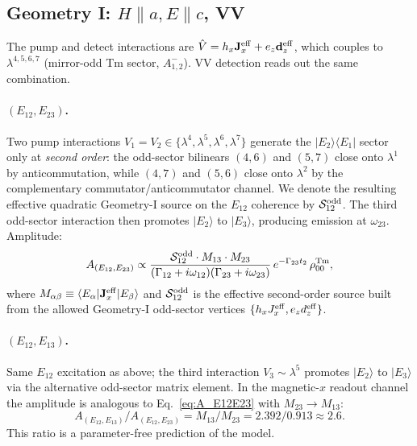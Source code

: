 \documentclass[reprint,amsmath,amssymb,aps,prb,longbibliography]{revtex4-2}
\newcommand{\Jeff}{\mathbf{J}^{\rm eff}}
\newcommand{\deff}{\mathbf{d}^{\rm eff}}
\begin{document}
\subsection{Geometry I: \texorpdfstring{$H\parallel a, E\parallel c$, VV}{H||a, E||c, VV}}

The pump and detect interactions are $\hat V = h_x\Jeff_x + e_z\deff_z$,
which couples to $\lambda^{4,5,6,7}$ (mirror-odd Tm sector, $A_{1,2}^-$).
VV detection reads out the same combination.

\paragraph{$(E_{12}, E_{23})$.} Two pump interactions $V_1 = V_2 \in
\{\lambda^4,\lambda^5,\lambda^6,\lambda^7\}$ generate the
$|E_2\rangle\langle E_1|$ sector only at \emph{second order}: the odd-sector
bilinears $(4,6)$ and $(5,7)$ close onto $\lambda^1$ by anticommutation,
while $(4,7)$ and $(5,6)$ close onto $\lambda^2$ by the complementary
commutator/anticommutator channel. We denote the resulting effective
quadratic Geometry-I source on the $E_{12}$ coherence by
$\mathcal S_{12}^{\rm odd}$. The third odd-sector interaction then promotes
$|E_2\rangle$ to $|E_3\rangle$, producing emission at $\omega_{23}$.
Amplitude:
\begin{equation}
A_{(E_{12},E_{23})} \propto
\frac{\mathcal S_{12}^{\rm odd}\cdot M_{13}\cdot M_{23}}
{(\Gamma_{12}+i\omega_{12})(\Gamma_{23}+i\omega_{23})}\,e^{-\Gamma_{23}t_2}\,\rho_{00}^{\rm Tm},
\label{eq:A_E12E23}
\end{equation}
where $M_{\alpha\beta}\equiv\langle E_\alpha|\Jeff_x|E_\beta\rangle$ and
$\mathcal S_{12}^{\rm odd}$ is the effective second-order source built from
the allowed Geometry-I odd-sector vertices
$\{h_x J_x^{\rm eff}, e_z d_z^{\rm eff}\}$.

\paragraph{$(E_{12}, E_{13})$.} Same $E_{12}$ excitation as above; the
third interaction $V_3\sim\lambda^5$ promotes $|E_2\rangle$ to
$|E_3\rangle$ via the alternative odd-sector matrix element. In the
magnetic-$x$ readout channel the amplitude is analogous to
Eq.~\eqref{eq:A_E12E23} with $M_{23}\to M_{13}$:
\begin{equation}
A_{(E_{12},E_{13})}/A_{(E_{12},E_{23})} = M_{13}/M_{23} = 2.392/0.913 \approx 2.6.
\label{eq:E13overE23}
\end{equation}
This ratio is a parameter-free prediction of the model.
\end{document}
